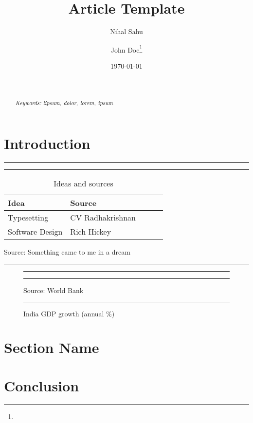 \documentclass[a4paper]{article}
\title{Article Template}
\author{Nihal Sahu \and John Doe\thanks{\lipsum[4]}}
\date{\today}
\newenvironment{floatintro}{\bigskip\footnotesize}{\bigskip}
\newenvironment{floatsource}{\medskip}{\smallskip\hrule}
\begin{document}
\maketitle
\begin{abstract}
    \lipsum[5]
    \\\\

    \textit{Keywords: lipsum, dolor, lorem, ipsum}
\end{abstract}
\newpage
\tableofcontents
\newpage

\section{Introduction}
\lipsum

\begin{table}[htbp]
\hrule height 1pt\medskip
\caption{Ideas and sources}
\hrule
\begin{floatintro}
    \lipsum[4]
\end{floatintro}
\footnotesize\begin{center}
    \begin{tabular}{ l l l l l }
    \midrule
    Idea & Source \\\midrule
    Typesetting & CV Radhakrishnan \\
    Software Design & Rich Hickey \\\bottomrule
    \end{tabular}
\end{center}
\begin{floatsource}
Source: Something came to me in a dream
\end{floatsource}
\end{table}

\begin{figure}
\hrule height 1pt\medskip
\caption{India GDP growth (annual \%)}
\hrule
\begin{floatintro}
    \lipsum[4]    
\end{floatintro}
\footnotesize\begin{center}
\end{center}
\begin{floatsource}
Source: World Bank
\end{floatsource}
\end{figure}

\section{Section Name}
\lipsum
\section{Conclusion}
\lipsum
\end{document}
